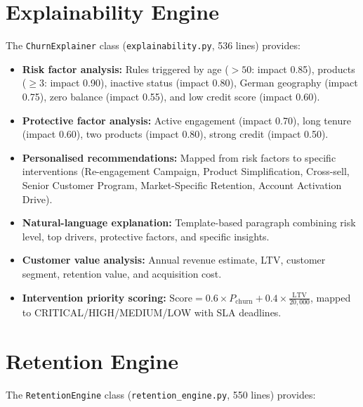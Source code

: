 \documentclass[12pt, a4paper]{report}
\begin{document}
\section{Explainability Engine}

The \texttt{ChurnExplainer} class (\texttt{explainability.py}, 536 lines) provides:

\begin{itemize}
    \item \textbf{Risk factor analysis:} Rules triggered by age ($>50$: impact 0.85), products ($\geq 3$: impact 0.90), inactive status (impact 0.80), German geography (impact 0.75), zero balance (impact 0.55), and low credit score (impact 0.60).
    \item \textbf{Protective factor analysis:} Active engagement (impact 0.70), long tenure (impact 0.60), two products (impact 0.80), strong credit (impact 0.50).
    \item \textbf{Personalised recommendations:} Mapped from risk factors to specific interventions (Re-engagement Campaign, Product Simplification, Cross-sell, Senior Customer Program, Market-Specific Retention, Account Activation Drive).
    \item \textbf{Natural-language explanation:} Template-based paragraph combining risk level, top drivers, protective factors, and specific insights.
    \item \textbf{Customer value analysis:} Annual revenue estimate, LTV, customer segment, retention value, and acquisition cost.
    \item \textbf{Intervention priority scoring:} $\text{Score} = 0.6 \times P_{\text{churn}} + 0.4 \times \frac{\text{LTV}}{20{,}000}$, mapped to CRITICAL/HIGH/MEDIUM/LOW with SLA deadlines.
\end{itemize}

\section{Retention Engine}

The \texttt{RetentionEngine} class (\texttt{retention\_engine.py}, 550 lines) provides:
\end{document}
